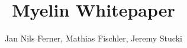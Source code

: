 \documentclass[a4paper]{article}
\title{Myelin Whitepaper}
\author{Jan Nils Ferner, Mathias Fischler, Jeremy Stucki}
\begin{document}
\maketitle
\thispagestyle{empty}

\clearpage

\twocolumn

\begin{abstract}
    
\end{abstract}

\clearpage

\onecolumn
\tableofcontents
\twocolumn

\clearpage






\clearpage

\listoffigures

\clearpage

\nocite{*}


\end{document}
